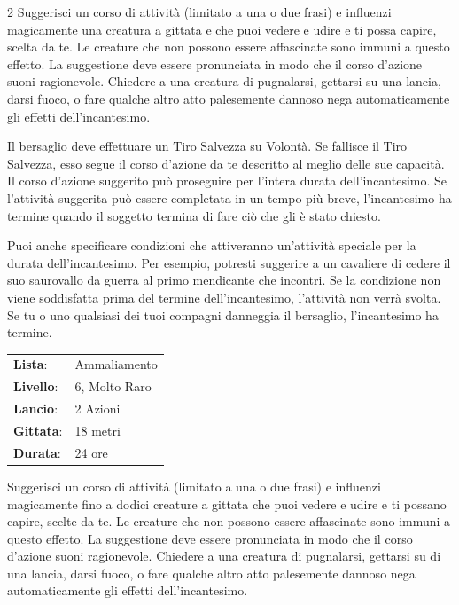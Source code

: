 \begin{multicols}{2}
Suggerisci un corso di attività (limitato a una o due frasi) e influenzi magicamente una creatura a gittata e che puoi vedere e udire e ti possa capire, scelta da te. Le creature che non possono essere affascinate sono immuni a questo effetto. La suggestione deve essere pronunciata in modo che il corso d'azione suoni ragionevole. Chiedere a una creatura di pugnalarsi, gettarsi su una lancia, darsi fuoco, o fare qualche altro atto palesemente dannoso nega automaticamente gli effetti dell'incantesimo.

Il bersaglio deve effettuare un Tiro Salvezza su Volontà. Se fallisce il Tiro Salvezza, esso segue il corso d'azione da te descritto al meglio delle sue capacità. Il corso d'azione suggerito può proseguire per l'intera durata dell'incantesimo. Se l'attività suggerita può essere completata in un tempo più breve, l'incantesimo ha termine quando il soggetto termina di fare ciò che gli è stato chiesto.

Puoi anche specificare condizioni che attiveranno un'attività speciale per la durata dell'incantesimo. Per esempio, potresti suggerire a un cavaliere di cedere il suo saurovallo da guerra al primo mendicante che incontri. Se la condizione non viene soddisfatta prima del termine dell'incantesimo, l'attività non verrà svolta. Se tu o uno qualsiasi dei tuoi compagni danneggia il bersaglio, l'incantesimo ha termine.

\noindent\begin{tabularx}{\linewidth}{p{1.9cm}X}
	\rowcolor{gray!20}\textbf{Lista}: & Ammaliamento \\
	\textbf{Livello}: & 6, Molto Raro \\
	\rowcolor{gray!20}\textbf{Lancio}: & 2 Azioni \\
	\textbf{Gittata}: & 18 metri \\
	\rowcolor{gray!20}\textbf{Durata}: & 24 ore \\
\end{tabularx}\smallskip

Suggerisci un corso di attività (limitato a una o due frasi) e influenzi magicamente fino a dodici creature a gittata che puoi vedere e udire e ti possano capire, scelte da te. Le creature che non possono essere affascinate sono immuni a questo effetto. La suggestione deve essere pronunciata in modo che il corso d'azione suoni ragionevole. Chiedere a una creatura di pugnalarsi, gettarsi su di una lancia, darsi fuoco, o fare qualche altro atto palesemente dannoso nega automaticamente gli effetti dell'incantesimo.


\end{multicols}
